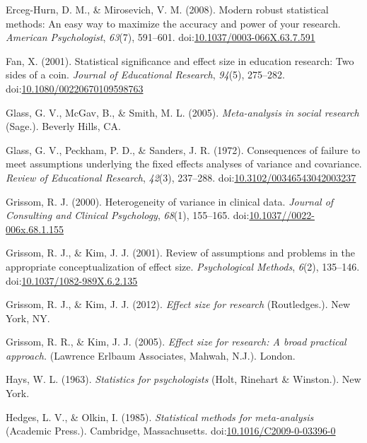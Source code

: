 \documentclass[
  man,floatsintext]{apa6}
\begin{document}
\leavevmode\hypertarget{ref-Erceg-Hurn_Mirosevich_2008}{}%
Erceg-Hurn, D. M., \& Mirosevich, V. M. (2008). Modern robust statistical methods: An easy way to maximize the accuracy and power of your research. \emph{American Psychologist}, \emph{63}(7), 591--601. doi:\href{https://doi.org/10.1037/0003-066X.63.7.591}{10.1037/0003-066X.63.7.591}

\leavevmode\hypertarget{ref-Fan_2001}{}%
Fan, X. (2001). Statistical significance and effect size in education research: Two sides of a coin. \emph{Journal of Educational Research}, \emph{94}(5), 275--282. doi:\href{https://doi.org/10.1080/00220670109598763}{10.1080/00220670109598763}

\leavevmode\hypertarget{ref-Glass_et_al_1981}{}%
Glass, G. V., McGav, B., \& Smith, M. L. (2005). \emph{Meta-analysis in social research} (Sage.). Beverly Hills, CA.

\leavevmode\hypertarget{ref-Glass_et_al_1972}{}%
Glass, G. V., Peckham, P. D., \& Sanders, J. R. (1972). Consequences of failure to meet assumptions underlying the fixed effects analyses of variance and covariance. \emph{Review of Educational Research}, \emph{42}(3), 237--288. doi:\href{https://doi.org/10.3102/00346543042003237}{10.3102/00346543042003237}

\leavevmode\hypertarget{ref-Grissom_2000}{}%
Grissom, R. J. (2000). Heterogeneity of variance in clinical data. \emph{Journal of Consulting and Clinical Psychology}, \emph{68}(1), 155--165. doi:\href{https://doi.org/10.1037//0022-006x.68.1.155}{10.1037//0022-006x.68.1.155}

\leavevmode\hypertarget{ref-Grissom_Kim_2001}{}%
Grissom, R. J., \& Kim, J. J. (2001). Review of assumptions and problems in the appropriate conceptualization of effect size. \emph{Psychological Methods}, \emph{6}(2), 135--146. doi:\href{https://doi.org/10.1037/1082-989X.6.2.135}{10.1037/1082-989X.6.2.135}

\leavevmode\hypertarget{ref-Grissom_and_Kim_2012}{}%
Grissom, R. J., \& Kim, J. J. (2012). \emph{Effect size for research} (Routledges.). New York, NY.

\leavevmode\hypertarget{ref-Grissom_and_kim_2005}{}%
Grissom, R. R., \& Kim, J. J. (2005). \emph{Effect size for research: A broad practical approach.} (Lawrence Erlbaum Associates, Mahwah, N.J.). London.

\leavevmode\hypertarget{ref-Hays_1963}{}%
Hays, W. L. (1963). \emph{Statistics for psychologists} (Holt, Rinehart \& Winston.). New York.

\leavevmode\hypertarget{ref-Hedges_Olkin_1985}{}%
Hedges, L. V., \& Olkin, I. (1985). \emph{Statistical methods for meta-analysis} (Academic Press.). Cambridge, Massachusetts. doi:\href{https://doi.org/10.1016/C2009-0-03396-0}{10.1016/C2009-0-03396-0}
\end{document}
